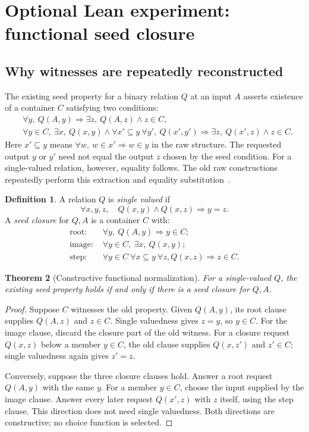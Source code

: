 \documentclass[11pt,letterpaper]{article}
\newtheorem{theorem}{Theorem}[section]
\theoremstyle{definition}\newtheorem{definition}[theorem]{Definition}
\theoremstyle{remark}\newtheorem{remark}[theorem]{Remark}
\begin{document}
\section{Optional Lean experiment: functional seed closure}

\subsection{Why witnesses are repeatedly reconstructed}

The existing seed property for a binary relation $Q$ at an input $A$ asserts existence of a container $C$ satisfying two conditions:
\begin{align*}
&\forall y,\ Q(A,y)\Rightarrow\exists z,\ Q(A,z)\land z\in C,\\
&\forall y\in C,\ \exists x,\ Q(x,y)\land
  \forall x'\subseteq y\ \forall y',\ Q(x',y')\Rightarrow
  \exists z,\ Q(x',z)\land z\in C.
\end{align*}
Here $x'\subseteq y$ means $\forall w,\ w\in x'\Rightarrow w\in y$ in the raw structure. The requested output $y$ or $y'$ need not equal the output $z$ chosen by the seed condition. For a single-valued relation, however, equality follows. The old raw constructions repeatedly perform this extraction and equality substitution~\cite{seed,lowerfiles}.

\begin{definition}
A relation $Q$ is \emph{single valued} if
\[
\forall x,y,z,\quad Q(x,y)\land Q(x,z)\Rightarrow y=z.
\]
A \emph{seed closure} for $Q,A$ is a container $C$ with:
\begin{align*}
\text{root: }&\forall y,\ Q(A,y)\Rightarrow y\in C;\\
\text{image: }&\forall y\in C,\ \exists x,\ Q(x,y);\\
\text{step: }&\forall y\in C\ \forall x\subseteq y\ \forall z,
 Q(x,z)\Rightarrow z\in C.
\end{align*}
\end{definition}

\begin{theorem}[Constructive functional normalization]\label{thm:seed}
For a single-valued $Q$, the existing seed property holds if and only if there is a seed closure for $Q,A$.
\end{theorem}
\begin{proof}
Suppose $C$ witnesses the old property. Given $Q(A,y)$, its root clause supplies $Q(A,z)$ and $z\in C$. Single valuedness gives $z=y$, so $y\in C$. For the image clause, discard the closure part of the old witness. For a closure request $Q(x,z)$ below a member $y\in C$, the old clause supplies $Q(x,z')$ and $z'\in C$; single valuedness again gives $z'=z$.

Conversely, suppose the three closure clauses hold. Answer a root request $Q(A,y)$ with the same $y$. For a member $y\in C$, choose the input supplied by the image clause. Answer every later request $Q(x',z)$ with $z$ itself, using the step clause. This direction does not need single valuedness. Both directions are constructive; no choice function is selected.
\end{proof}
\end{document}
